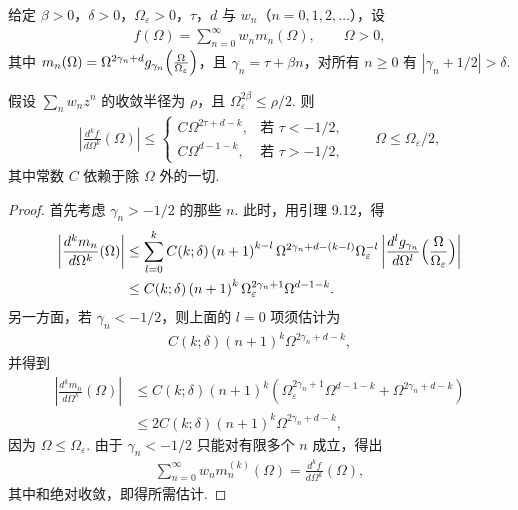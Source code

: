 \begin{lemma}\label{lem:9.14}
给定 $\beta > 0$，$\delta > 0$，$\Omega_{\varepsilon} > 0$，$\tau$，$d$ 与 $w_n$（$n = 0, 1, 2, \ldots$），设
\begin{align*}
  f(\Omega)=\sum_{n=0}^{\infty}w_{n}m_{n}(\Omega),\qquad \Omega>0,
\end{align*}
其中 $m_{n}(\Omega)=\Omega^{2\gamma_{n}+d}g_{\gamma_{n}}\Bigl(\frac{\Omega}{\Omega_{\varepsilon}}\Bigr)$，且 $\gamma_{n} = \tau + \beta n$，对所有 $n \geq 0$ 有 $|\gamma_{n} + 1/2| > \delta$.

假设 $\sum_{n} w_{n}z^{n}$ 的收敛半径为 $\rho$，且 $\Omega_{\varepsilon}^{2\beta} \leq \rho/2$. 则
\begin{align*}
  \left|\frac{d^{k}f}{d\Omega^{k}}(\Omega)\right|\leq
  \begin{cases}
    C\Omega^{2\tau+d-k}, & \text{若 } \tau<-1/2,\\
    C\Omega^{d-1-k}, & \text{若 } \tau>-1/2,
  \end{cases}
  \qquad \Omega\leq\Omega_{\varepsilon}/2,
\end{align*}
其中常数 $C$ 依赖于除 $\Omega$ 外的一切.
\end{lemma}

\begin{proof}
首先考虑 $\gamma_n > -1/2$ 的那些 $n$. 此时，用引理 9.12，得
\begin{align*}
  \left|\frac{d^{k} m_{n}}{d\Omega^{k}}(\Omega)\right|
  &\leq\sum_{l=0}^{k} C(k;\delta)\left(n+1\right)^{k-l}
   \Omega^{2\gamma_{n}+d-(k-l)}\Omega_{\varepsilon}^{-l}
   \left|\frac{d^{l} g_{\gamma_{n}}}{d\Omega^{l}}\Bigl(\frac{\Omega}{\Omega_{\varepsilon}}\Bigr)\right|\\
  &\leq C(k;\delta)\left(n+1\right)^{k}\Omega_{\varepsilon}^{2\gamma_{n}+1}\Omega^{d-1-k}.
\end{align*}
另一方面，若 $\gamma_{n} < -1/2$，则上面的 $l = 0$ 项须估计为
\begin{align*}
  C(k;\delta)\left(n+1\right)^{k}\Omega^{2\gamma_{n}+d-k},
\end{align*}
并得到
\begin{align*}
  \left|\frac{d^{k}m_{n}}{d\Omega^{k}}(\Omega)\right|
  &\leq C(k;\delta)\left(n+1\right)^{k}
   \left(\Omega_{\varepsilon}^{2\gamma_{n}+1}\Omega^{d-1-k}+\Omega^{2\gamma_{n}+d-k}\right)\\
  &\leq 2C(k;\delta)(n+1)^{k}\Omega^{2\gamma_{n}+d-k},
\end{align*}
因为 $\Omega \leq \Omega_{\varepsilon}$. 由于 $\gamma_n < -1/2$ 只能对有限多个 $n$ 成立，得出
\begin{align*}
  \sum_{n=0}^{\infty}w_{n}m_{n}^{(k)}(\Omega)=\frac{d^{k}f}{d\Omega^{k}}(\Omega),
\end{align*}
其中和绝对收敛，即得所需估计.
\end{proof}

